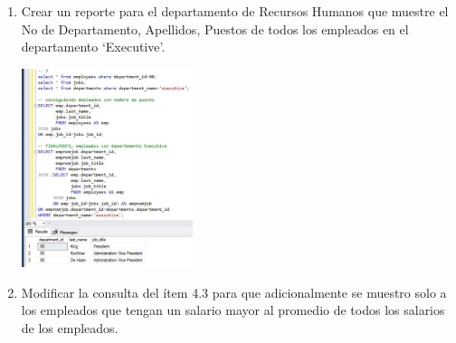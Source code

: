 \begin{enumerate}[1.]
	\item Crear un reporte para el departamento de Recursos Humanos que muestre el No de Departamento, Apellidos, Puestos de todos los empleados en el departamento ‘Executive’.

	\begin{center}
	\includegraphics[width=5cm]{./Imagenes/actividad0907} 
	\end{center}

	\item Modificar la consulta del ítem 4.3 para que adicionalmente se muestro solo a los empleados que tengan un salario mayor al promedio de todos los salarios de los empleados.
\end{enumerate}
